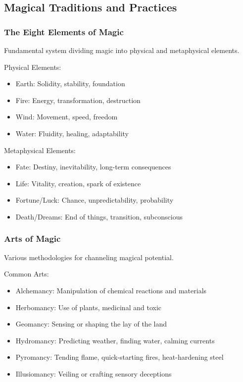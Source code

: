 \subsection{Magical Traditions and Practices}

\subsubsection{The Eight Elements of Magic}
\label{sec:eightelements}

Fundamental system dividing magic into physical and metaphysical elements.

Physical Elements:
\begin{itemize}
    \item Earth: Solidity, stability, foundation
    \item Fire: Energy, transformation, destruction
    \item Wind: Movement, speed, freedom
    \item Water: Fluidity, healing, adaptability
\end{itemize}

Metaphysical Elements:
\begin{itemize}
    \item Fate: Destiny, inevitability, long-term consequences
    \item Life: Vitality, creation, spark of existence
    \item Fortune/Luck: Chance, unpredictability, probability
    \item Death/Dreams: End of things, transition, subconscious
\end{itemize}

\subsubsection{Arts of Magic}
\label{sec:magicarts}

Various methodologies for channeling magical potential.

Common Arts:
\begin{itemize}
    \item Alchemancy: Manipulation of chemical reactions and materials
    \item Herbomancy: Use of plants, medicinal and toxic
    \item Geomancy: Sensing or shaping the lay of the land
    \item Hydromancy: Predicting weather, finding water, calming currents
    \item Pyromancy: Tending flame, quick-starting fires, heat-hardening steel
    \item Illusiomancy: Veiling or crafting sensory deceptions
\end{itemize}

